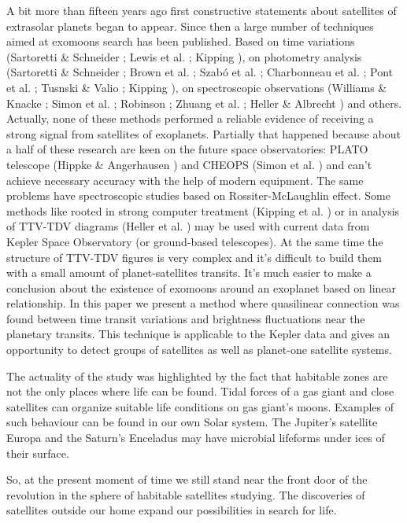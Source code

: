 \documentclass[12pt]{article}
\begin{document}
A bit more than fifteen years ago first constructive statements about satellites of extrasolar planets began to appear. Since then a large number of techniques aimed at exomoons search has been published. Based on time variations (Sartoretti \& Schneider \cite{sartoret} ; Lewis et al. \cite{lewis}; Kipping \cite{kipp1} ), on photometry analysis (Sartoretti \& Schneider \cite{sartoret}; Brown et al. \cite{brown}; Szabó et al. \cite{szab}; Charbonneau et al. \cite{charb}; Pont et al. \cite{pont}; Tusnski \& Valio \cite{tusnski}; Kipping \cite{kipp3}), on spectroscopic observations (Williams \& Knacke \cite{will}; Simon et al. \cite{simon1}; Robinson \cite{robin}; Zhuang et al. \cite{zhuang}; Heller \& Albrecht \cite{heller1}) and others.  Actually, none of these methods performed a reliable evidence of receiving a strong signal from satellites of exoplanets. Partially that happened because about a half of these research are keen on the future space observatories: PLATO telescope (Hippke \& Angerhausen \cite{hippk}) and CHEOPS (Simon et al. \cite{simon2}) and can't achieve necessary accuracy with the help of modern equipment. The same problems have spectroscopic studies based on Rossiter-McLaughlin effect. Some methods like rooted in strong computer treatment (Kipping et al. \cite{kipp5}) or in analysis of TTV-TDV diagrams (Heller et al. \cite{heller2}) may be used with current data from Kepler Space Observatory (or ground-based telescopes). At the same time the structure of TTV-TDV figures is very complex and it's difficult to build them with a small amount of planet-satellites transits. It's much easier to make a conclusion about the existence of exomoons around an exoplanet based on linear relationship.
In this paper we present a method where quasilinear connection was found between time transit variations and brightness fluctuations near the planetary transits. This technique is applicable to the Kepler data and gives an opportunity to detect groups of satellites as well as planet-one satellite systems.

The actuality of the study was highlighted by the fact that habitable zones are not the only places where life can be found. Tidal forces of a gas giant and close satellites can organize suitable life conditions on gas giant's moons. Examples of such behaviour can be found in our own Solar system. The Jupiter's satellite Europa and the Saturn's Enceladus may have microbial lifeforms under ices of their surface.

So, at the present moment of time we still stand near the front door of the revolution in the sphere of habitable satellites studying. The discoveries of satellites outside our home expand our possibilities in search for life.
 
\end{document}

